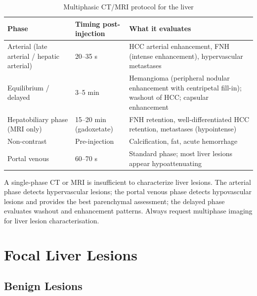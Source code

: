 \begin{table}[h]
\centering
\caption{Multiphasic CT/MRI protocol for the liver}
\begin{tabular}{p{3cm} p{3.5cm} p{5cm}}
\hline
\textbf{Phase} & \textbf{Timing post-injection} & \textbf{What it evaluates} \\
\hline
Arterial (late arterial / hepatic arterial) & 20--35 s & HCC arterial enhancement, FNH (intense enhancement), hypervascular metastases \\
Equilibrium / delayed & 3--5 min & Hemangioma (peripheral nodular enhancement with centripetal fill-in); washout of HCC; capsular enhancement \\
Hepatobiliary phase (MRI only) & 15--20 min (gadoxetate) & FNH retention, well-differentiated HCC retention, metastases (hypointense) \\
Non-contrast & Pre-injection & Calcification, fat, acute hemorrhage \\
Portal venous & 60--70 s & Standard phase; most liver lesions appear hypoattenuating \\
\hline
\end{tabular}
\end{table}

\begin{pearlbox}
A single-phase CT or MRI is insufficient to characterize liver lesions. The arterial phase detects hypervascular lesions; the portal venous phase detects hypovascular lesions and provides the best parenchymal assessment; the delayed phase evaluates washout and enhancement patterns. Always request multiphase imaging for liver lesion characterisation.
\end{pearlbox}


\section{Focal Liver Lesions}

\subsection{Benign Lesions}

